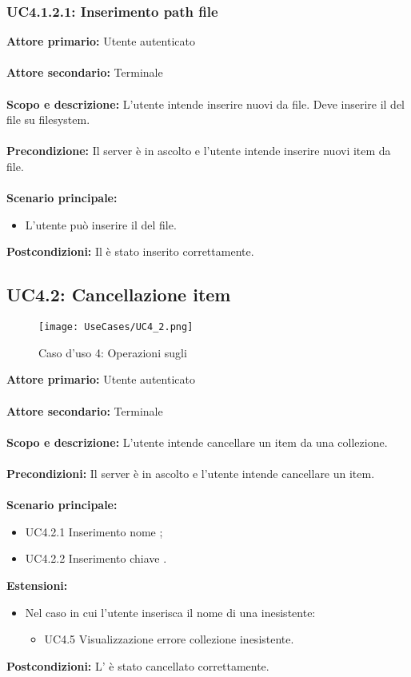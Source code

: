 \documentclass{scalatekids-article}
\begin{document}
\subsubsection{UC4.1.2.1: Inserimento path file}

\textbf{Attore primario:} Utente autenticato\\ \\
\textbf{Attore secondario:} Terminale\\ \\
\textbf{Scopo e descrizione:} L'utente intende inserire nuovi  da file. Deve inserire il  del file su filesystem.\\ \\
\textbf{Precondizione:} Il server è in ascolto e l'utente intende inserire nuovi item da file.\\ \\
\textbf{Scenario principale:}
\begin{itemize}
\item L'utente può inserire il  del file.
\end{itemize}
\textbf{Postcondizioni:} Il  è stato inserito correttamente.

\subsection{UC4.2: Cancellazione item}

\begin{figure}[H]
  \begin{center}
    \texttt{[image: UseCases/UC4\_2.png]}
    \caption*{Caso d'uso 4: Operazioni sugli }
  \end{center}
\end{figure}
\textbf{Attore primario:} Utente autenticato\\ \\
\textbf{Attore secondario:} Terminale\\ \\
\textbf{Scopo e descrizione:} L'utente intende cancellare un item da una collezione.\\ \\
\textbf{Precondizioni:} Il server è in ascolto e l'utente intende cancellare un item.\\ \\
\textbf{Scenario principale:}
\begin{itemize}
\item UC4.2.1 Inserimento nome ;
\item UC4.2.2 Inserimento chiave .
\end{itemize}
\textbf{Estensioni:}
\begin{itemize}
\item Nel caso in cui l'utente inserisca il nome di una  inesistente:
  \begin{itemize}
  \item UC4.5 Visualizzazione errore collezione inesistente.
  \end{itemize}
\end{itemize}
\textbf{Postcondizioni:} L' è stato cancellato correttamente.
\end{document}
